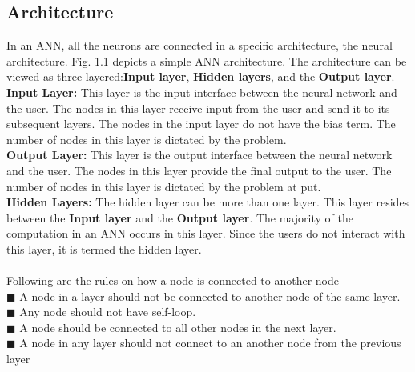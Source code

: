 \documentclass[12pt,a4paper,bold]{thesis}
\theoremstyle{thm}
\theoremstyle{definition}
\begin{document}
\subsection{Architecture}
\indent \indent In an ANN, all the neurons are connected in a specific architecture, the neural architecture. Fig. 1.1 depicts a simple ANN architecture.
The architecture can be viewed as three-layered:\textbf{Input layer}, \textbf{Hidden layers}, and the \textbf{Output layer}.\\
\indent \textbf{Input Layer:}
This layer is the input interface between the neural network and the user. The nodes in this layer receive input from the user and send it to its subsequent layers. The nodes in the input layer do not have the bias term. The number of nodes in this layer is dictated by the problem. \\
\indent \textbf{Output Layer:}
This layer is the output interface between the neural network and the user. The nodes in this layer provide the final output to the user. The number of nodes in this layer is dictated by the problem at put.\\
\indent \textbf{Hidden Layers:}
The hidden layer can be more than one layer. This layer resides between the \textbf{Input layer} and the \textbf{Output layer}. The majority of the computation in an ANN occurs in this layer.  
Since the users do not interact with this layer, it is termed the hidden layer.\\\\
Following are the rules on how a node is connected to another node\\
$\blacksquare$ A node in a layer should not be connected to another node of the same layer.\\
$\blacksquare$ Any node should not have self-loop.\\
$\blacksquare$ A node should be connected to all other nodes in the next layer.\\
$\blacksquare$ A node in any layer should not connect to an another node from the previous layer\\
\end{document}

